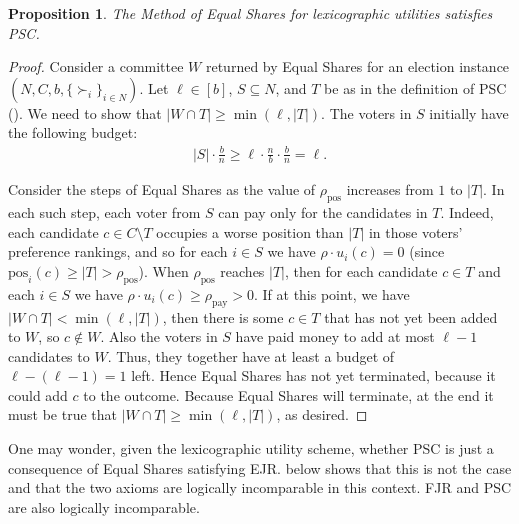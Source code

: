 \documentclass[10pt]{scrartcl}
\renewcommand*{\ge}{\geqslant}
\renewcommand*{\geq}{\geqslant}
\theoremstyle{definition}
\theoremstyle{plain}
\newtheorem{proposition}{Proposition}
\newcommand{\pos}{{{{\mathrm{pos}}}}}
\begin{document}
\begin{proposition}\label{prop:rulex_and_psc}
	The Method of Equal Shares for lexicographic utilities satisfies PSC.
\end{proposition}
\begin{proof}
	Consider a committee $W$ returned by Equal Shares for an election instance $(N, C, b, \{\succ_i\}_{i \in N})$. Let $\ell \in [b]$, $S \subseteq N$, and $T$ be as in the definition of PSC (). We need to show that $|W \cap T| \ge \min(\ell, |T|)$. The voters in $S$ initially have the following budget:
	\begin{align*}
		\textstyle
		|S| \cdot \frac{b}{n} \geq \ell \cdot \frac{n}{b} \cdot \frac{b}{n} = \ell \text{.}
	\end{align*}
	
	Consider the steps of Equal Shares as the value of $\rho_{\text{pos}}$ increases from $1$ to $|T|$. In each such step, each voter from $S$ can pay only for the candidates in $T$. Indeed, each candidate $c \in C \setminus T$ occupies a worse position than $|T|$ in those voters' preference rankings, and so for each $i \in S$ we have $\rho \cdot u_i(c) = 0$ (since $\pos_i(c) \ge |T| > \rho_{\text{pos}}$). When $\rho_{\text{pos}}$ reaches $|T|$, then for each candidate $c \in T$ and each $i \in S$ we have $\rho \cdot u_i(c) \ge \rho_{\text{pay}} > 0$. If at this point, we have $|W \cap T| < \min(\ell, |T|)$, then there is some $c \in T$ that has not yet been added to $W$, so $c \not\in W$. Also the voters in $S$ have paid money to add at most $\ell - 1$ candidates to $W$. Thus, they together have at least a budget of $\ell - (\ell -1) = 1$ left. Hence Equal Shares has not yet terminated, because it could add $c$ to the outcome. Because Equal Shares will terminate, at the end it must be true that $|W \cap T| \ge \min(\ell, |T|)$, as desired.
\end{proof}

One may wonder, given the lexicographic utility scheme, whether PSC is just a consequence of Equal Shares satisfying EJR.  below shows that this is not the case and that the two axioms are logically incomparable in this context. FJR and PSC are also logically incomparable.
\end{document}
